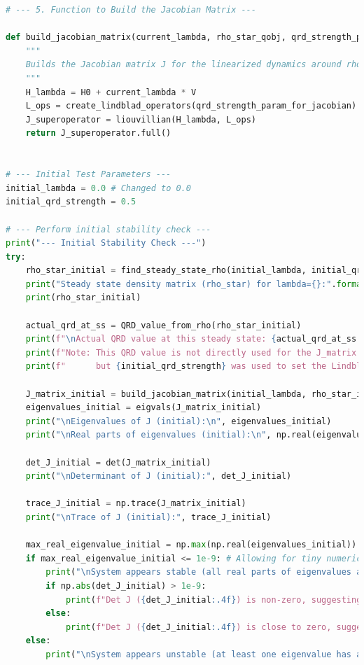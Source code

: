 \documentclass[9pt]{article}
\begin{document}
\begin{lstlisting}[language=Python, basicstyle=\ttfamily\footnotesize, breaklines=true, frame=single, caption={Python Code for Stability Analysis of Quantum Subsystem}, label={lst:qrd_code}]
# --- 5. Function to Build the Jacobian Matrix ---

def build_jacobian_matrix(current_lambda, rho_star_qobj, qrd_strength_param_for_jacobian):
    """
    Builds the Jacobian matrix J for the linearized dynamics around rho_star.
    """
    H_lambda = H0 + current_lambda * V
    L_ops = create_lindblad_operators(qrd_strength_param_for_jacobian)
    J_superoperator = liouvillian(H_lambda, L_ops)
    return J_superoperator.full()


# --- Initial Test Parameters ---
initial_lambda = 0.0 # Changed to 0.0
initial_qrd_strength = 0.5

# --- Perform initial stability check ---
print("--- Initial Stability Check ---")
try:
    rho_star_initial = find_steady_state_rho(initial_lambda, initial_qrd_strength)
    print("Steady state density matrix (rho_star) for lambda={}:".format(initial_lambda))
    print(rho_star_initial)

    actual_qrd_at_ss = QRD_value_from_rho(rho_star_initial)
    print(f"\nActual QRD value at this steady state: {actual_qrd_at_ss:.4f}")
    print(f"Note: This QRD value is not directly used for the J_matrix calculation in this linear approach,")
    print(f"      but {initial_qrd_strength} was used to set the Lindblad operator strength.")

    J_matrix_initial = build_jacobian_matrix(initial_lambda, rho_star_initial, initial_qrd_strength)
    eigenvalues_initial = eigvals(J_matrix_initial)
    print("\nEigenvalues of J (initial):\n", eigenvalues_initial)
    print("\nReal parts of eigenvalues (initial):\n", np.real(eigenvalues_initial))

    det_J_initial = det(J_matrix_initial)
    print("\nDeterminant of J (initial):", det_J_initial)

    trace_J_initial = np.trace(J_matrix_initial)
    print("\nTrace of J (initial):", trace_J_initial)

    max_real_eigenvalue_initial = np.max(np.real(eigenvalues_initial))
    if max_real_eigenvalue_initial <= 1e-9: # Allowing for tiny numerical errors
        print("\nSystem appears stable (all real parts of eigenvalues are non-positive).")
        if np.abs(det_J_initial) > 1e-9:
            print(f"Det J ({det_J_initial:.4f}) is non-zero, suggesting stable and diverse phenotypes.")
        else:
            print(f"Det J ({det_J_initial:.4f}) is close to zero, suggesting potential collapse to monoculture or degenerate states.")
    else:
        print("\nSystem appears unstable (at least one eigenvalue has a positive real part).")


\end{lstlisting}
\end{document}
